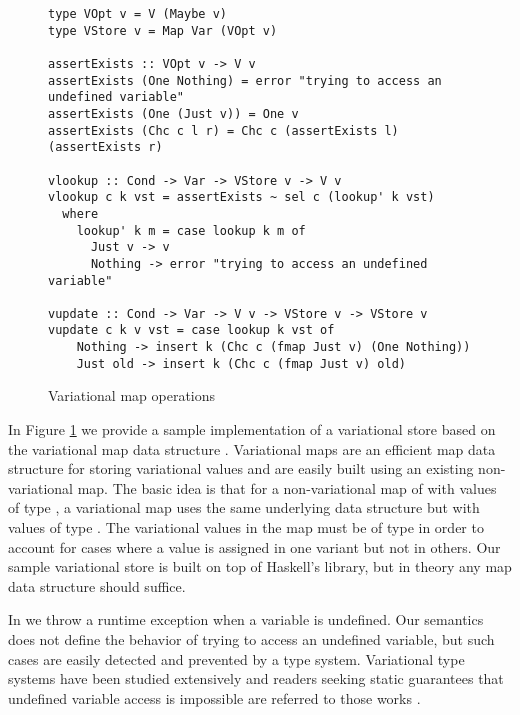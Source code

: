 \documentclass[12pt,oneside]{book}
\begin{document}
\begin{figure}
\begin{lstlisting}
type VOpt v = V (Maybe v)
type VStore v = Map Var (VOpt v)

assertExists :: VOpt v -> V v
assertExists (One Nothing) = error "trying to access an undefined variable"
assertExists (One (Just v)) = One v
assertExists (Chc c l r) = Chc c (assertExists l) (assertExists r)

vlookup :: Cond -> Var -> VStore v -> V v
vlookup c k vst = assertExists ~ sel c (lookup' k vst)
  where
    lookup' k m = case lookup k m of
      Just v -> v
      Nothing -> error "trying to access an undefined variable"

vupdate :: Cond -> Var -> V v -> VStore v -> VStore v
vupdate c k v vst = case lookup k vst of
    Nothing -> insert k (Chc c (fmap Just v) (One Nothing))
    Just old -> insert k (Chc c (fmap Just v) old)
\end{lstlisting}
\caption{Variational map operations}
\label{fig:varmap}
\end{figure}

In Figure \ref{fig:varmap} we provide a sample implementation of a variational store based on the variational map data structure \cite{varwhile, Walk14onward}.
Variational maps are an efficient map data structure for storing variational values and are easily built using an existing non-variational map. The basic idea
is that for a non-variational map of with values of type , a variational map uses the same underlying data structure but with values of type .
The variational values in the map must be of type  in order to account for cases where a value is assigned in one variant but not in others. Our sample
variational store is built on top of Haskell's  library, but in theory any map data structure should suffice.

In  we throw a runtime exception when a variable is undefined. Our semantics does not define the behavior of trying to access an undefined variable, but
such cases are easily detected and prevented by a type system. Variational type systems have been studied extensively and readers seeking static guarantees
that undefined variable access is impossible are referred to those works \cite{kenner2010typechef,CEW12icfp,CEW14toplas}.
\end{document}

